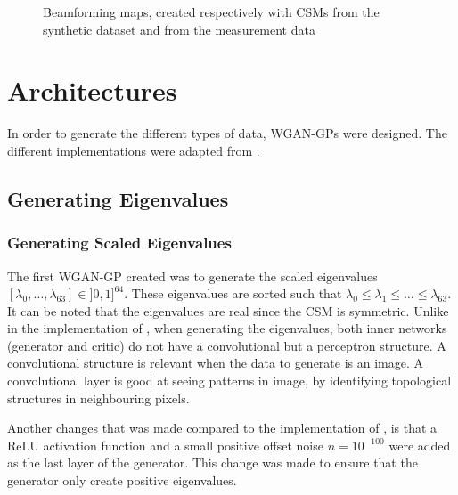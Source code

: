 \documentclass[11pt,a4paper,twoside]{report}
\begin{document}
\begin{figure}
    \centering
    \caption{Beamforming maps, created respectively with CSMs from the synthetic dataset and from the measurement data}
    \label{fig:datasets_beamforming_example}    
\end{figure}

\section{Architectures}

In order to generate the different types of data, WGAN-GPs were designed. The different implementations were adapted from \cite{nain2020wgangp}.

\subsection{Generating Eigenvalues}

\subsubsection{Generating Scaled Eigenvalues}

The first WGAN-GP created was to generate the scaled eigenvalues $[\lambda_0, \dots, \lambda_{63}] \in ]0,1]^{64}$. These eigenvalues are sorted such that $\lambda_0 \leq \lambda_1 \leq \dots \leq \lambda_{63}$. It can be noted that the eigenvalues are real since the CSM is symmetric. Unlike in the implementation of \cite{nain2020wgangp}, when generating the eigenvalues, both inner networks (generator and critic) do not have a convolutional but a perceptron structure. A convolutional structure is relevant when the data to generate is an image. A convolutional layer is good at seeing patterns in image, by identifying topological structures in neighbouring pixels.

Another changes that was made compared to the implementation of \cite{nain2020wgangp}, is that a ReLU activation function and a small positive offset noise $n = 10^{-100}$ were added as the last layer of the generator. This change was made to ensure that the generator only create positive eigenvalues. 
\end{document}
